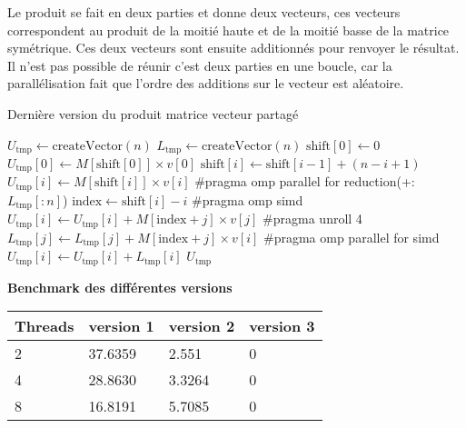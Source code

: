 \documentclass[11pt,french]{article}
\begin{document}
		\par Le produit se fait en deux parties et donne deux vecteurs, ces vecteurs correspondent au produit de la moitié haute et de la moitié basse de la matrice symétrique. Ces deux vecteurs sont ensuite additionnés pour renvoyer le résultat. Il n'est pas possible de réunir c'est deux parties en une boucle, car la parallélisation fait que l’ordre des additions sur le vecteur est aléatoire.
		
	\begin{algorithm}[H]
		\caption{Dernière version du produit matrice vecteur partagé}\label{alg:pmv}
		\begin{algorithmic}[0]
		\State $U_{\text{tmp}} \gets \text{createVector}(n)$
		\State $L_{\text{tmp}} \gets \text{createVector}(n)$
		\State $\text{shift}[0] \gets 0$ 
		\State $U_{\text{tmp}}[0] \gets M[\text{shift}[0]] \times v[0]$  
		\State $\text{shift}[i] \gets \text{shift}[i-1] + (n - i + 1)$
		\State $U_{\text{tmp}}[i] \gets M[\text{shift}[i]] \times v[i]$
		\EndFor
		\State \#pragma omp parallel for reduction(+:$L_{\text{tmp}}[:n]$)
		\State $\text{index} \gets \text{shift}[i] - i$
		\State \#pragma omp simd
		 
		\State $U_{\text{tmp}}[i] \gets U_{\text{tmp}}[i] + M[\text{index} + j] \times v[j]$
		\EndFor
		\State \#pragma unroll 4
		 
		\State $L_{\text{tmp}}[j] \gets L_{\text{tmp}}[j] + M[\text{index} + j] \times v[i]$
		\EndFor
		\EndFor
		\State \#pragma omp parallel for simd
		  
		\State $U_{\text{tmp}}[i] \gets U_{\text{tmp}} [i] + L_{\text{tmp}}[i]$
		\EndFor
		\State \Return $U_{\text{tmp}} $
		\EndFunction
		\end{algorithmic}
	\end{algorithm}
	
	\vspace*{0.5cm}
	
	\noindent \textbf{Benchmark des différentes versions}
	\begin{table}[h]
		\centering
		\begin{tabular}{ |p{2cm}|p{2cm}|p{2cm}|p{2cm}|  }
			\hline
			Threads & version 1 & version 2 & version 3\\
			\hline
			2  &  37.6359  &   2.551& 0\\
			4  &  28.8630  &   3.3264 & 0\\
			8  &  16.8191  &   5.7085 &0\\
			\hline
		\end{tabular}
	\end{table}
	
\end{document}
